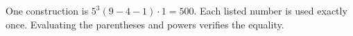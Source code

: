 One construction is $\boxed{5^3(9-4-1)\cdot1=500}$. Each listed number is used exactly once. Evaluating the parentheses and powers verifies the equality.
